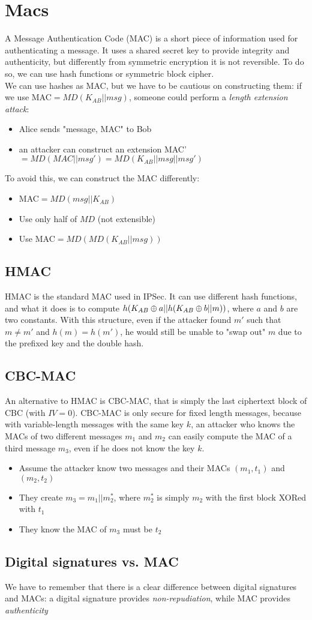 \section{Macs}
A Message Authentication Code (MAC) is a short piece of information used for authenticating a message. It uses a shared secret key to provide integrity and authenticity, but differently from symmetric encryption it is not reversible. To do so, we can use hash functions or symmetric block cipher.\\
We can use hashes as MAC, but we have to be cautious on constructing them: if we use MAC$=MD(K_{AB}||msg)$, someone could perform a \textit{length extension attack}:
\begin{itemize}
    \item Alice sends "message, MAC" to Bob
    \item an attacker can construct an extension MAC'$=MD(MAC||msg')=MD(K_{AB}||msg||msg')$
\end{itemize}
To avoid this, we can construct the MAC differently:
\begin{itemize}
    \item MAC$=MD(msg||K_{AB})$
    \item Use only half of $MD$ (not extensible)
    \item Use MAC$=MD(MD(K_{AB}||msg))$
\end{itemize}

\subsection{HMAC}
HMAC is the standard MAC used in IPSec. It can use different hash functions, and what it does is to compute $h(K_{AB}\oplus a || h(K_{AB}\oplus b ||m))$, where $a$ and $b$ are two constants. With this structure, even if the attacker found $m'$ such that $m\neq m'$ and $h(m)=h(m')$, he would still be unable to "swap out" $m$ due to the prefixed key and the double hash.

\subsection{CBC-MAC}
An alternative to HMAC is CBC-MAC, that is simply the last ciphertext block of CBC (with $IV=0$). CBC-MAC is only secure for fixed length messages, because with variable-length messages with the same key $k$, an attacker who knows the MACs of two different messages $m_1$ and $m_2$ can easily compute the MAC of a third message $m_3$, even if he does not know the key $k$.
\begin{itemize}
    \item Assume the attacker know two messages and their MACs $(m_1,t_1)$ and $(m_2,t_2)$
    \item They create $m_3=m_1||m_2^*$, where $m_2^*$ is simply $m_2$ with the first block XORed with $t_1$
    \item They know the MAC of $m_3$ must be $t_2$
\end{itemize}

\subsection{Digital signatures vs. MAC}
We have to remember that there is a clear difference between digital signatures and MACs: a digital signature provides \textit{non-repudiation}, while MAC provides \textit{authenticity}
